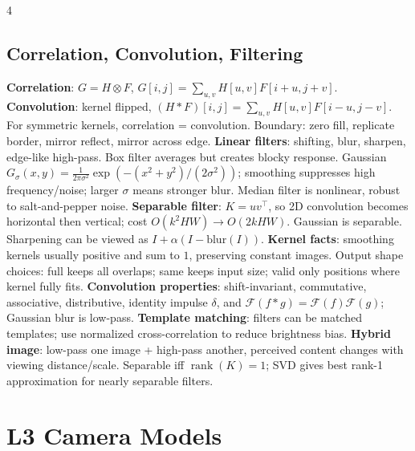 \documentclass[8pt,a4paper,landscape]{extarticle}
\newcommand{\key}[1]{\textbf{#1}}
\begin{document}
\begin{multicols*}{4}
\subsection{Correlation, Convolution, Filtering}
\key{Correlation}: $G=H\otimes F$, $G[i,j]=\sum_{u,v}H[u,v]F[i+u,j+v]$. \key{Convolution}: kernel flipped, $(H*F)[i,j]=\sum_{u,v}H[u,v]F[i-u,j-v]$. For symmetric kernels, correlation = convolution. Boundary: zero fill, replicate border, mirror reflect, mirror across edge.
\key{Linear filters}: shifting, blur, sharpen, edge-like high-pass. Box filter averages but creates blocky response. Gaussian
$G_\sigma(x,y)=\frac{1}{2\pi\sigma^2}\exp(-(x^2+y^2)/(2\sigma^2))$; smoothing suppresses high frequency/noise; larger $\sigma$ means stronger blur. Median filter is nonlinear, robust to salt-and-pepper noise.
\key{Separable filter}: $K=uv^\top$, so 2D convolution becomes horizontal then vertical; cost $O(k^2HW)\to O(2kHW)$. Gaussian is separable. Sharpening can be viewed as $I+\alpha(I-\mathrm{blur}(I))$.
\key{Kernel facts}: smoothing kernels usually positive and sum to $1$, preserving constant images. Output shape choices: full keeps all overlaps; same keeps input size; valid only positions where kernel fully fits. \key{Convolution properties}: shift-invariant, commutative, associative, distributive, identity impulse $\delta$, and $\mathcal F(f*g)=\mathcal F(f)\mathcal F(g)$; Gaussian blur is low-pass. \key{Template matching}: filters can be matched templates; use normalized cross-correlation to reduce brightness bias. \key{Hybrid image}: low-pass one image + high-pass another, perceived content changes with viewing distance/scale. Separable iff $\operatorname{rank}(K)=1$; SVD gives best rank-1 approximation for nearly separable filters.

\section{L3 Camera Models}

\end{multicols*}
\end{document}

